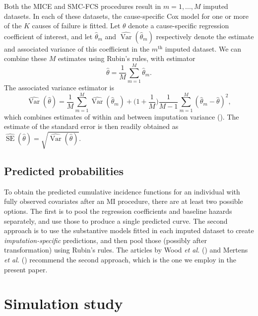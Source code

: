 \documentclass[
  letterpaper,
  paper=240mm:170mm,
  twoside=true,
  open=right,
  fontsize=10pt,
  pagesize=false,
  BCOR=15mm,
  DIV=14,
  headinclude=true,
  footinclude=false,
  headsepline=on]{scrbook}
\DeclareMathOperator{\Var}{Var}
\DeclareMathOperator{\SE}{SE}
\begin{document}
Both the MICE and SMC-FCS procedures result in \(m = 1,...,M\) imputed
datasets. In each of these datasets, the cause-specific Cox model for
one or more of the \(K\) causes of failure is fitted. Let \(\theta\)
denote a cause-specific regression coefficient of interest, and let
\(\hat{\theta}_m\) and \(\widehat{\Var}(\hat{\theta}_m)\) respectively
denote the estimate and associated variance of this coefficient in the
\(m^{\text{th}}\) imputed dataset. We can combine these \(M\) estimates
using Rubin's rules, with estimator \begin{equation*}
    \hat{\theta} = \frac{1}{M}\sum_{m=1}^{M}\hat{\theta}_m.
\end{equation*} The associated variance estimator is \begin{equation*}
    \widehat{\Var}(\hat{\theta}) = \frac{1}{M}\sum_{m=1}^{M}\widehat{\Var}(\hat{\theta}_m) + \big(1 + \frac{1}{M}\big)\frac{1}{M-1}\sum_{m=1}^{M}(\hat{\theta}_m - \hat{\theta})^2,
\end{equation*} which combines estimates of within and between
imputation variance (). The
estimate of the standard error is then readily obtained as
\(\widehat{\SE}(\hat{\theta}) = \sqrt{\widehat{\Var}(\hat{\theta})}\).

\subsection{Predicted probabilities}\label{predicted-probabilities}

To obtain the predicted cumulative incidence functions for an individual
with fully observed covariates after an MI procedure, there are at least
two possible options. The first is to pool the regression coefficients
and baseline hazards separately, and use those to produce a single
predicted curve. The second approach is to use the substantive models
fitted in each imputed dataset to create \emph{imputation-specific}
predictions, and then pool those (possibly after transformation) using
Rubin's rules. The articles by Wood \emph{et al.}
() and Mertens
\emph{et al.}
()
recommend the second approach, which is the one we employ in the present
paper.

\section{Simulation study}\label{sec-simstudy}
\end{document}
